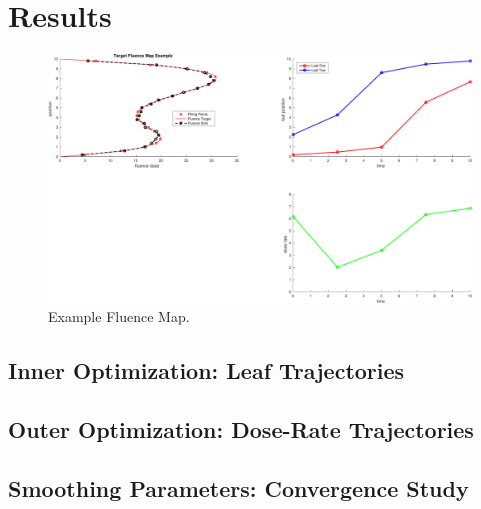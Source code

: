 \section{Results}


\begin{figure}
  \centering
  \includegraphics[width=\textwidth]{fig/ExampleFluenceMap.pdf}
  \caption{Example Fluence Map.}
  \label{fig:linearSpline}
\end{figure}



\subsection{Inner Optimization:  Leaf Trajectories}



\subsection{Outer Optimization:  Dose-Rate Trajectories}


\subsection{Smoothing Parameters:  Convergence Study}
